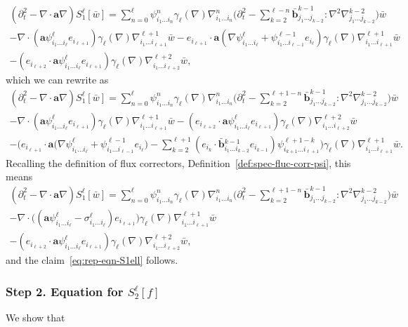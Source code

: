 \documentclass[10pt]{amsart}
\theoremstyle{plain}
\theoremstyle{definition}
\numberwithin{equation}{section}
\newcommand{\ee}{e}
\newcommand{\Aa}{\boldsymbol a}
\newcommand{\bb}{{\boldsymbol b}}
\newcommand{\step}[1]{\subsubsection*{Step \textup #1}}
\begin{document}
{\begin{multline*}
(\partial_t^2-\nabla \cdot \Aa \nabla) S_1^\ell[\bar w]=
\sum_{n=0}^{\ell} \psi^n_{i_1\ldots i_n} \gamma_\ell(\nabla)\nabla^n_{i_1\ldots i_n} \Big(\partial_t^2-\sum_{k=2}^{\ell-n} \bar \bb^{k-1}_{j_1\ldots j_{k-2}}:\nabla^2\nabla^{k-2}_{j_1\ldots j_{k-2}}\Big) \bar w
\\
- \nabla \cdot (\Aa \psi^\ell_{i_1\ldots i_\ell}\ee_{i_{\ell+1}}) \gamma_\ell(\nabla) \nabla^{\ell+1}_{i_1\ldots i_{\ell+1}}\bar w
- \ee_{i_{\ell+1}}\cdot\Aa(\nabla \psi^\ell_{i_1\ldots i_\ell}+\psi^{\ell-1}_{i_1\ldots i_{\ell-1}} e_{i_\ell})\gamma_\ell(\nabla) \nabla^{\ell+1}_{i_1\ldots i_{\ell+1}} \bar w\\
-(\ee_{i_{\ell+2}}\cdot\Aa \psi^\ell_{i_1\ldots i_{\ell}} e_{i_{\ell+1}}) \gamma_\ell(\nabla) \nabla^{\ell+2}_{i_1\ldots i_{\ell+2}} \bar w,
\end{multline*}
which we can rewrite as\vspace*{-3pt}
\begin{multline*}
(\partial_t^2-\nabla \cdot \Aa \nabla) S_1^\ell[\bar w]=
\sum_{n=0}^{\ell} \psi^n_{i_1\ldots i_n} \gamma_\ell(\nabla)\nabla^n_{i_1\ldots i_n} \Big(\partial_t^2-\sum_{k=2}^{\ell+1-n}\bar \bb^{k-1}_{j_1\ldots j_{k-2}}:\nabla^2\nabla^{k-2}_{j_1\ldots j_{k-2}}\Big) \bar w
\\
- \nabla \cdot (\Aa \psi^\ell_{i_1\ldots i_\ell}\ee_{i_{\ell+1}}) \gamma_\ell(\nabla) \nabla^{\ell+1}_{i_1\ldots i_{\ell+1}}\bar w -(\ee_{i_{\ell+2}}\cdot\Aa \psi^\ell_{i_1\ldots i_{\ell}} e_{i_{\ell+1}}) \gamma_\ell(\nabla) \nabla^{\ell+2}_{i_1\ldots i_{\ell+2}} \bar w\\
- \Big(\ee_{i_{\ell+1}}\cdot\Aa(\nabla \psi^\ell_{i_1\ldots i_\ell}+\psi^{\ell-1}_{i_1\ldots i_{\ell-1}} e_{i_\ell}\big)-\sum_{k=2}^{\ell+1}(\ee_{i_{k}}\cdot\bar\bb{}^{k-1}_{i_1\ldots i_{k-2}}\ee_{i_{k-1}})\psi^{\ell+1-k}_{i_{k+1}\ldots i_{\ell+1}} \Big) \gamma_\ell(\nabla)\nabla^{\ell+1}_{i_1\ldots i_{\ell+1}} \bar w.
\end{multline*}
Recalling the definition of flux correctors, \cf Definition~\ref{def:spec-fluc-corr-psi}, this means\vspace*{-3pt}\enlargethispage{\baselineskip}
\begin{multline*}
(\partial_t^2-\nabla \cdot \Aa \nabla) S_1^\ell[\bar w]=
\sum_{n=0}^\ell \psi^n_{i_1\ldots i_n} \gamma_\ell(\nabla)\nabla^n_{i_1\ldots i_n}\Big(\partial_t^2-\sum_{k=2}^{\ell+1-n} \bar \bb^{k-1}_{j_1\ldots j_{k-2}}:\nabla^2\nabla^{k-2}_{j_1\ldots j_{k-2}}\Big) \bar w\\
- \nabla \cdot \big((\Aa \psi^\ell_{i_1\ldots i_\ell}-\sigma^\ell_{i_1\ldots i_\ell})\ee_{i_{\ell+1}}\big) \gamma_\ell(\nabla) \nabla^{\ell+1}_{i_1\ldots i_{\ell+1}}\bar w
\\
-(\ee_{i_{\ell+2}}\cdot\Aa \psi^\ell_{i_1\ldots i_{\ell}} e_{i_{\ell+1}}) \gamma_\ell(\nabla) \nabla^{\ell+2}_{i_1\ldots i_{\ell+2}} \bar w,
\end{multline*}
and the claim~\eqref{eq:rep-eqn-S1ell} follows.

\step{2. Equation for $S_2^{\ell}[f]$}
We show that}\vspace*{-7pt}
\end{document}
